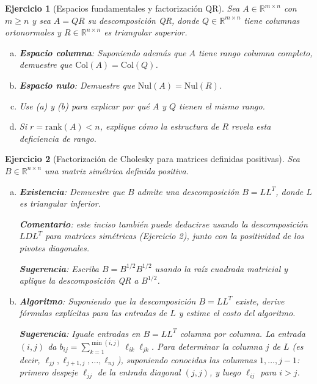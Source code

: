 \documentclass[12pt]{article}
\newtheorem{exercise}{Ejercicio}
\begin{document}
\begin{exercise}[Espacios fundamentales y factorización QR]
Sea $A \in \mathbb{R}^{m \times n}$ con $m \geq n$ y sea $A = QR$ su descomposición QR, donde $Q \in \mathbb{R}^{m \times n}$ tiene columnas ortonormales y $R \in \mathbb{R}^{n \times n}$ es triangular superior.
\begin{enumerate}[(a)]
\item \textbf{Espacio columna}: Suponiendo además que $A$ tiene rango columna completo, demuestre que $\text{Col}(A) = \text{Col}(Q)$.
\item \textbf{Espacio nulo}: Demuestre que $\text{Nul}(A) = \text{Nul}(R)$.
\item Use (a) y (b) para explicar por qué $A$ y $Q$ tienen el mismo rango.
\item Si $r = \text{rank}(A) < n$, explique cómo la estructura de $R$ revela esta deficiencia de rango.
\end{enumerate}
\end{exercise}

\begin{exercise}[Factorización de Cholesky para matrices definidas positivas]
Sea $B \in \mathbb{R}^{n \times n}$ una matriz simétrica definida positiva.
\begin{enumerate}[(a)]
\item \textbf{Existencia}: Demuestre que $B$ admite una descomposición $B = LL^T$, donde $L$ es triangular inferior.

\textbf{Comentario}: este inciso también puede deducirse usando la descomposición $LDL^T$ para matrices simétricas (Ejercicio 2), junto con la positividad de los pivotes diagonales.

\textbf{Sugerencia}: Escriba $B = B^{1/2} B^{1/2}$ usando la raíz cuadrada matricial y aplique la descomposición QR a $B^{1/2}$.
\item \textbf{Algoritmo}: Suponiendo que la descomposición $B = LL^T$ existe, derive fórmulas explícitas para las entradas de $L$ y estime el costo del algoritmo.

\textbf{Sugerencia}: Iguale entradas en $B = LL^T$ columna por columna. La entrada $(i,j)$ da $b_{ij} = \sum_{k=1}^{\min(i,j)} \ell_{ik}\ell_{jk}$. Para determinar la columna $j$ de $L$ (es decir, $\ell_{jj}, \ell_{j+1,j}, \ldots, \ell_{nj}$), suponiendo conocidas las columnas $1, \ldots, j-1$: primero despeje $\ell_{jj}$ de la entrada diagonal $(j,j)$, y luego $\ell_{ij}$ para $i > j$.
\end{enumerate}
\end{exercise}
\end{document}
